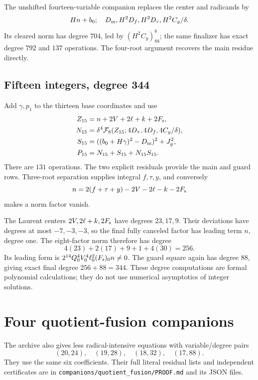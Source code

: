 \documentclass[11pt,a4paper]{article}
\theoremstyle{definition}\newtheorem{definition}[theorem]{Definition}
\theoremstyle{remark}\newtheorem{remark}[theorem]{Remark}
\newcommand{\F}{\mathcal F}\newcommand{\Cal}{\mathcal K}
\newcommand{\Dm}{D_{\rm m}}\newcommand{\Dt}{D_{\tau}}
\newcommand{\Df}{D_f}\newcommand{\Dy}{D_y}\newcommand{\Ag}{A_{\rm g}}
\numberwithin{equation}{section}
\begin{document}
The unshifted fourteen-variable companion replaces the center and
radicands by
\[
Hn+b_0;\quad \Dm,H^2\Df,H^2\Dt,H^2C_y/\delta .
\]
Its cleared norm has degree \(704\), led by \((H^2C_y)_{88}^8\);
the same finalizer has exact degree \(792\) and \(137\) operations.
The four-root argument recovers the main residue directly.

\subsection{Fifteen integers, degree 344}
Add \(\gamma,p_1\) to the thirteen base coordinates and use
\begin{align}
Z_{15}&=n+2V+2\ell+k+2F_{\rm s},\nonumber\\
N_{15}&=\delta^4\F_8(Z_{15};4\Dt,4\Df,4C_y/\delta),\nonumber\\
S_{15}&=((b_0+H\gamma)^2-\Dm)^2+J_g^2,\nonumber\\
P_{15}&=N_{15}+S_{15}+N_{15}S_{15}.
\label{eq:fifteen}
\end{align}
There are \(131\) operations.
The two explicit residuals provide the main and guard rows.
Three-root separation supplies integral \(f,\tau,y\), and conversely
\[
n=2(f+\tau+y)-2V-2\ell-k-2F_{\rm s}
\]
makes a norm factor vanish.

The Laurent centers \(2V,2\ell+k,2F_{\rm s}\) have degrees
\(23,17,9\). Their deviations have degrees at most
\(-7,-3,-3\), so the final fully canceled factor has leading term
\(n\), degree one. The eight-factor norm therefore has degree
\[
4(23)+2(17)+9+1+4(30)=256.
\]
Its leading form is
\(2^{14}Q_0^4V_0^4\ell_0^2(F_{\rm s})_0n\ne0\).
The guard square again has degree \(88\), giving exact final
degree \(256+88=344\).
These degree computations are formal polynomial calculations;
they do not use numerical asymptotics of integer solutions.

\section{Four quotient-fusion companions}\label{sec:quotient}

The archive also gives less radical-intensive equations with
variable/degree pairs
\[
(20,24),\quad(19,28),\quad(18,32),\quad(17,88).
\]
They use the same six coefficients. Their full literal residual
lists and independent certificates are in
\texttt{companions/quotient\_fusion/PROOF.md} and its JSON files.
\end{document}
